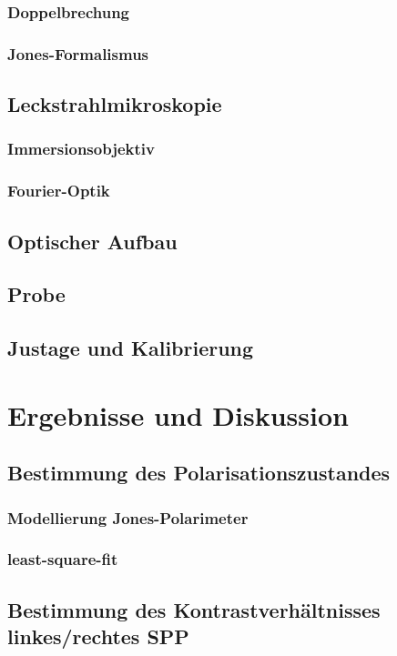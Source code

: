 \documentclass{article}
\begin{document}
	\subsubsection{Doppelbrechung}
	\subsubsection{Jones-Formalismus}
\subsection{Leckstrahlmikroskopie}
	\subsubsection{Immersionsobjektiv}
	\subsubsection{Fourier-Optik}
\subsection{Optischer Aufbau}
\subsection{Probe}
\subsection{Justage und Kalibrierung}
\section{Ergebnisse und Diskussion}
	\subsection{Bestimmung des Polarisationszustandes}
		\subsubsection{Modellierung Jones-Polarimeter}
		\subsubsection{least-square-fit}
	\subsection{Bestimmung des Kontrastverhältnisses linkes/rechtes SPP}
\end{document}
